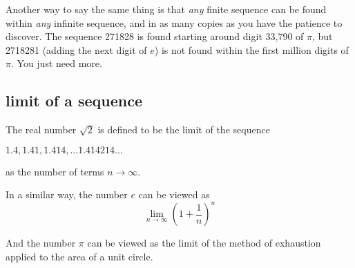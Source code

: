\documentclass[11pt, oneside]{article}
\begin{document}
Another way to say the same thing is that \emph{any} finite sequence can be found within \emph{any} infinite sequence, and in as many copies as you have the patience to discover.  The sequence 271828 is found starting around digit 33,790 of $\pi$, but 2718281 (adding the next digit of $e$) is not found within the first million digits of $\pi$.  You just need more.

\subsection*{limit of a sequence}

The real number $\sqrt{2}$ is defined to be the limit of the sequence 

$1.4, 1.41, 1.414, \dots 1.414214 \dots$ 

as the number of terms $n \rightarrow \infty$.

In a similar way, the number $e$ can be viewed as
\[ \lim_{n \rightarrow \infty} (1 + \frac{1}{n})^n \]

And the number $\pi$ can be viewed as the limit of the method of exhaustion applied to the area of a unit circle.
\end{document}
